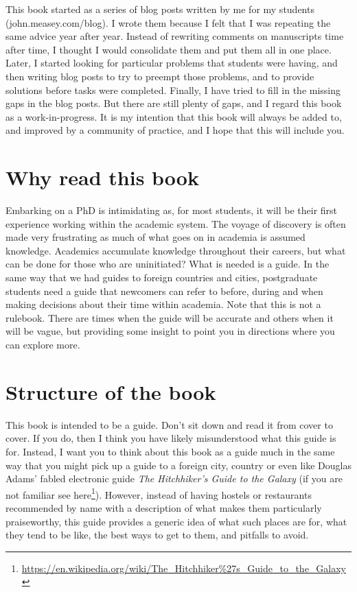 \documentclass[
]{krantz}
\renewcommand{\href}[2]{#2\footnote{\url{#1}}}
\begin{document}
This book started as a series of blog posts written by me for my students (john.measey.com/blog). I wrote them because I felt that I was repeating the same advice year after year. Instead of rewriting comments on manuscripts time after time, I thought I would consolidate them and put them all in one place. Later, I started looking for particular problems that students were having, and then writing blog posts to try to preempt those problems, and to provide solutions before tasks were completed. Finally, I have tried to fill in the missing gaps in the blog posts. But there are still plenty of gaps, and I regard this book as a work-in-progress. It is my intention that this book will always be added to, and improved by a community of practice, and I hope that this will include you.

\hypertarget{why-read-this-book}{%
\section*{Why read this book}\label{why-read-this-book}}


Embarking on a PhD is intimidating as, for most students, it will be their first experience working within the academic system. The voyage of discovery is often made very frustrating as much of what goes on in academia is assumed knowledge. Academics accumulate knowledge throughout their careers, but what can be done for those who are uninitiated? What is needed is a guide. In the same way that we had guides to foreign countries and cities, postgraduate students need a guide that newcomers can refer to before, during and when making decisions about their time within academia. Note that this is not a rulebook. There are times when the guide will be accurate and others when it will be vague, but providing some insight to point you in directions where you can explore more.

\hypertarget{structure-of-the-book}{%
\section*{Structure of the book}\label{structure-of-the-book}}


This book is intended to be a guide. Don't sit down and read it from cover to cover. If you do, then I think you have likely misunderstood what this guide is for. Instead, I want you to think about this book as a guide much in the same way that you might pick up a guide to a foreign city, country or even like Douglas Adams' fabled electronic guide \emph{The Hitchhiker's Guide to the Galaxy} \citet{adams2017ultimate} (if you are not familiar \href{https://en.wikipedia.org/wiki/The_Hitchhiker\%27s_Guide_to_the_Galaxy}{see here}). However, instead of having hostels or restaurants recommended by name with a description of what makes them particularly praiseworthy, this guide provides a generic idea of what such places are for, what they tend to be like, the best ways to get to them, and pitfalls to avoid.
\end{document}
